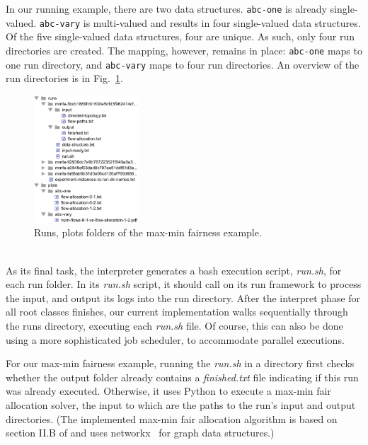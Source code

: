 \noindent In our running example, there are two data structures. \texttt{abc-one} is already single-valued. \texttt{abc-vary} is multi-valued and results in four single-valued data structures. Of the five single-valued data structures, four are unique. As such, only four run directories are created. The mapping, however, remains in place: \texttt{abc-one} maps to one run directory, and \texttt{abc-vary} maps to four run directories. An overview of the run directories is in Fig.~\ref{fig:runs}.

\begin{figure}
\includegraphics[width=0.35\textwidth]{figures/runs-plots.pdf}
\caption{Runs, plots folders of the max-min fairness example.}
\label{fig:runs}
\vspace{-6pt}
\end{figure}

\\
As its final task, the interpreter generates a bash execution script, \textit{run.sh}, for each run folder. In its \textit{run.sh} script, it should call on its run framework to process the input, and output its logs into the run directory. After the interpret phase for all root classes finishes, our current implementation walks sequentially through the runs directory, executing each \textit{run.sh} file. Of course, this can also be done using a more sophisticated job scheduler, \eg to accommodate parallel executions.

For our max-min fairness example, running the \textit{run.sh} in a directory first checks whether the output folder already contains a \textit{finished.txt} file indicating if this run was already executed. Otherwise, it uses Python to execute a max-min fair allocation solver, the input to which are the paths to the run's input and output directories. (The implemented max-min fair allocation algorithm is based on section II.B of \cite{nace2006} and uses networkx~\cite{networkx} for graph data structures.)

